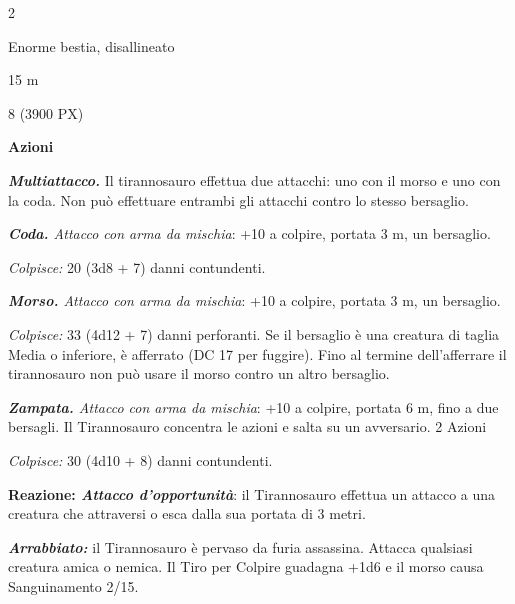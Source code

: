 \begin{multicols}{2}
{
\begin{description}[noitemsep, topsep=0pt, parsep=0pt, partopsep=0pt, itemsep=1pt, leftmargin=2.35cm,  labelwidth=2.2cm, itemindent=0cm, listparindent=0pt] %
\setlength{\baselineskip}{10pt}
\item[\textbf{Taglia/Tipo}] Enorme bestia, disallineato
\item[\textbf{Caratt.}] 
\item[\textbf{Punti Ferita}] 
\item[\textbf{Movimento}] 15 m
\item[\textbf{Tiri Salvez.}] 
\item[\textbf{Sfida}] 8 (3900 PX)
\end{description}
\smallskip

\textbf{Azioni}

\emph{\textbf{Multiattacco.}} Il tirannosauro effettua due attacchi: uno con il morso e uno con la coda. Non può effettuare entrambi gli attacchi contro lo stesso bersaglio.

\emph{\textbf{Coda.} Attacco con arma da mischia}: +10 a colpire, portata 3 m, un bersaglio.

\emph{Colpisce:} 20 (3d8 + 7) danni contundenti.

\emph{\textbf{Morso.} Attacco con arma da mischia}: +10 a colpire, portata 3 m, un bersaglio.

\emph{Colpisce:} 33 (4d12 + 7) danni perforanti. Se il bersaglio è una creatura di taglia Media o inferiore, è afferrato (DC 17 per fuggire). Fino al termine dell'afferrare il tirannosauro non può usare il morso contro un altro bersaglio.

\emph{\textbf{Zampata.} Attacco con arma da mischia}: +10 a colpire, portata 6 m, fino a due bersagli. Il Tirannosauro concentra le azioni e salta su un avversario. 2 Azioni

\emph{Colpisce:} 30 (4d10 + 8) danni contundenti.

\textbf{Reazione: \emph{Attacco d'opportunità}}: il Tirannosauro effettua un attacco a una creatura che attraversi o esca dalla sua portata di 3 metri.

\emph{\textbf{Arrabbiato:}} il Tirannosauro è pervaso da furia assassina. Attacca qualsiasi creatura amica o nemica. Il Tiro per Colpire guadagna +1d6 e il morso causa Sanguinamento 2/15.

}
\end{multicols}
